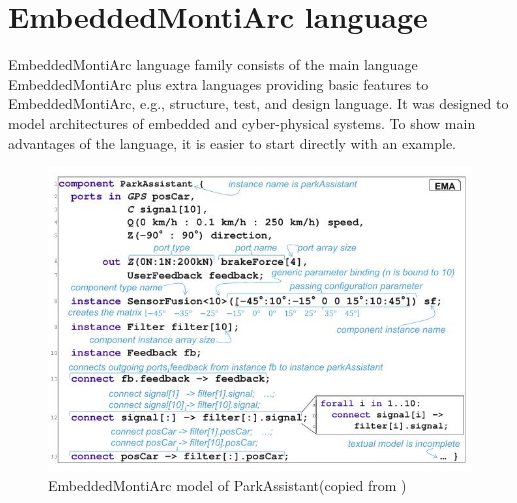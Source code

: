 \section{EmbeddedMontiArc language} \label{sec:ema}
EmbeddedMontiArc language family consists of the main language EmbeddedMontiArc plus extra languages providing basic features to EmbeddedMontiArc, e.g., structure, test, and design language. It was designed to model architectures of embedded and cyber-physical systems. To show main advantages of the language, it is easier to start directly with an example.
\begin{figure}[h!]
    \centering
    \includegraphics[width=\linewidth]{src/pic/embdmontiarc}
    \caption{EmbeddedMontiArc model of ParkAssistant(copied from \cite{HR17})}
    \label{fig:embdmontiarc}
\end{figure}
